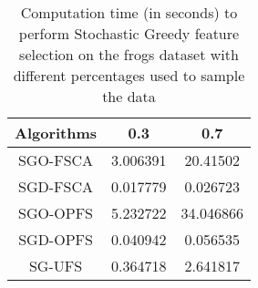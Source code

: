 \begin{table}
	\begin{center}
		\begin{tabular}{c c c}
			Algorithms & 0.3 & 0.7 \\
			\hline
			SGO-FSCA & 3.006391 & 20.41502 \\
			SGD-FSCA & 0.017779 & 0.026723 \\
			SGO-OPFS & 5.232722 & 34.046866 \\
			SGD-OPFS & 0.040942 & 0.056535 \\
			SG-UFS & 0.364718 & 2.641817 \\
		\end{tabular}
	\end{center}
	\caption{Computation time (in seconds) to perform Stochastic Greedy feature selection on the frogs dataset with different percentages used to sample the data}
\end{table}